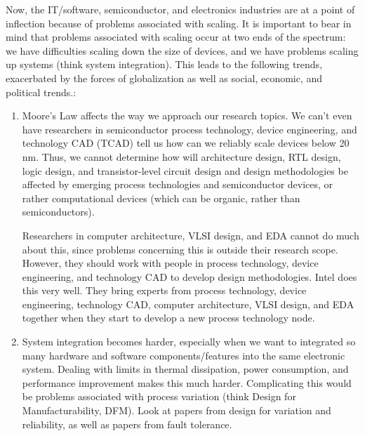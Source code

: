 Now, the IT/software, semiconductor, and electronics industries are at a point of inflection because of problems associated with scaling. It is important to bear in mind that problems associated with scaling occur at two ends of the spectrum: we have difficulties scaling down the size of devices, and we have problems scaling up systems (think system integration). This leads to the following trends, exacerbated by the forces of globalization as well as social, economic, and political trends.: \vspace{-0.3cm}
\begin{enumerate} \itemsep -4pt
\item Moore's Law affects the way we approach our research topics. We can't even have researchers in semiconductor process technology, device engineering, and technology CAD (TCAD) tell us how can we reliably scale devices below 20 nm. Thus, we cannot determine how will architecture design, RTL design, logic design, and transistor-level circuit design and design methodologies be affected by emerging process technologies and semiconductor devices, or rather computational devices (which can be organic, rather than semiconductors).

Researchers in computer architecture, VLSI design, and EDA cannot do much about this, since problems concerning this is outside their research scope. However, they should work with people in process technology, device engineering, and technology CAD to develop design methodologies. Intel does this very well. They bring experts from process technology, device engineering, technology CAD, computer architecture, VLSI design, and EDA together when they start to develop a new process technology node.
\item System integration becomes harder, especially when we want to integrated so many hardware and software components/features into the same electronic system. Dealing with limits in thermal dissipation, power consumption, and performance improvement makes this much harder. Complicating this would be problems associated with process variation (think Design for Manufacturability, DFM). Look at papers from design for variation and reliability, as well as papers from fault tolerance.


\end{enumerate}
